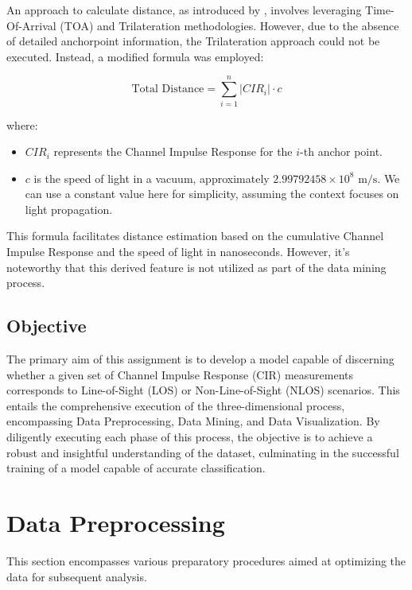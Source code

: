 \documentclass[
	article, %
	11pt, %
]{CSUniSchoolLabReport}
\begin{document}
An approach to calculate distance, as introduced by \cite{che_feature-based_2022}, involves leveraging Time-Of-Arrival (TOA) and Trilateration methodologies. However, due to the absence of detailed anchorpoint information, the Trilateration approach could not be executed. Instead, a modified formula was employed:


\begin{equation}
\text{Total Distance} = \sum_{i=1}^{n} |CIR_i| \cdot c
\end{equation}

where:

\begin{itemize}
  \item $CIR_i$ represents the Channel Impulse Response for the $i$-th anchor point.
  \item $c$ is the speed of light in a vacuum, approximately $2.99792458 \times 10^8 \text{ m/s}$. We can use a constant value here for simplicity, assuming the context focuses on light propagation.
\end{itemize}

This formula facilitates distance estimation based on the cumulative Channel Impulse Response and the speed of light in nanoseconds. However, it's noteworthy that this derived feature is not utilized as part of the data mining process.



\subsection{Objective}\label{objective}

The primary aim of this assignment is to develop a model capable of discerning whether a given set of Channel Impulse Response (CIR) measurements corresponds to Line-of-Sight (LOS) or Non-Line-of-Sight (NLOS) scenarios. This entails the comprehensive execution of the three-dimensional process, encompassing Data Preprocessing, Data Mining, and Data Visualization. By diligently executing each phase of this process, the objective is to achieve a robust and insightful understanding of the dataset, culminating in the successful training of a model capable of accurate classification.


\section{Data Preprocessing}\label{data_preprocessing}

This section encompasses various preparatory procedures aimed at optimizing the data for subsequent analysis.
\end{document}
